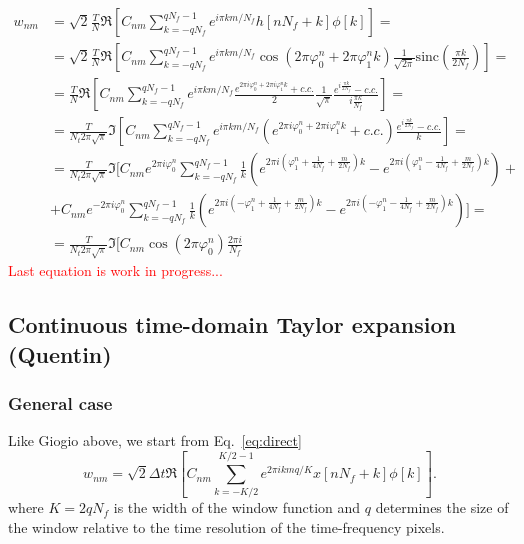 \documentclass{article}
\begin{document}
\begin{align}
w_{n m}&=\sqrt{2} \frac{T}{N} \Re \left[C_{n m} \sum_{k=-qN_f}^{qN_f-1} e^{i \pi k m / N_f} h\left[n N_f+k\right] \phi[k]\right]=\nonumber\\
&=\sqrt{2} \frac{T}{N} \Re \left[C_{n m} \sum_{k=-qN_f}^{qN_f-1} e^{i \pi k m / N_f}\cos\left(2\pi\varphi_0^n+2\pi\varphi_1^n k\right)\frac{1}{\sqrt{2\pi}}\text{sinc}\left(\frac{\pi k}{2 N_f}\right)\right]=\nonumber\\
&=\frac{T}{N} \Re \left[C_{n m} \sum_{k=-qN_f}^{qN_f-1} e^{i \pi k m / N_f}\frac{e^{2\pi i\varphi_0^n+2\pi i\varphi_1^n k}+c.c.}{2}\frac{1}{\sqrt{\pi}}\frac{e^{i\frac{\pi k}{2 N_f}}-c.c.}{i\frac{\pi k}{N_f}}\right]=\nonumber\\
&=\frac{T}{N_t2\pi\sqrt{\pi}} \Im \left[C_{n m} \sum_{k=-qN_f}^{qN_f-1} e^{i \pi k m / N_f}\left(e^{2\pi i\varphi_0^n+2\pi i\varphi_1^n k}+c.c.\right)\frac{e^{i\frac{\pi k}{2 N_f}}-c.c.}{k}\right]=\nonumber\\
&= \frac{T}{N_t2\pi\sqrt{\pi}} \Im \Bigg[C_{n m} e^{2\pi i\varphi_0^n}\sum_{k=-qN_f}^{qN_f-1}\frac{1}{k}\left(e^{2\pi i\left(\varphi_1^n+\frac{1}{4N_f}+\frac{m}{2N_f}\right) k}-e^{2\pi i\left(\varphi_1^n-\frac{1}{4N_f}+\frac{m}{2N_f}\right) k}\right)+\nonumber\\
&+C_{n m} e^{-2\pi i\varphi_0^n}\sum_{k=-qN_f}^{qN_f-1}\frac{1}{k}\left(e^{2\pi i\left(-\varphi_1^n+\frac{1}{4N_f}+\frac{m}{2N_f}\right) k}-e^{2\pi i\left(-\varphi_1^n-\frac{1}{4N_f}+\frac{m}{2N_f}\right) k}\right)\Bigg]=\nonumber\\
&=\frac{T}{N_t2\pi\sqrt{\pi}} \Im \Bigg[C_{n m} \cos(2\pi\varphi_0^n)\frac{2\pi i}{N_f}
\end{align}
\textcolor{red}{Last equation is work in progress...}

\subsection{Continuous time-domain Taylor expansion (Quentin)}

\subsubsection{General case}

Like Giogio above, we start from Eq.~\eqref{eq:direct}
\begin{equation}
w_{n m}=\sqrt{2} \Delta t \Re \left[C_{n m} \sum_{k=-K / 2}^{K / 2-1} e^{2\pi i k m q / K} x\left[n N_f+k\right] \phi[k]\right].
\end{equation}
where $K = 2q N_f$ is the width of the window function and $q$ determines the size of the window relative to the time resolution of the time-frequency pixels.
\end{document}
